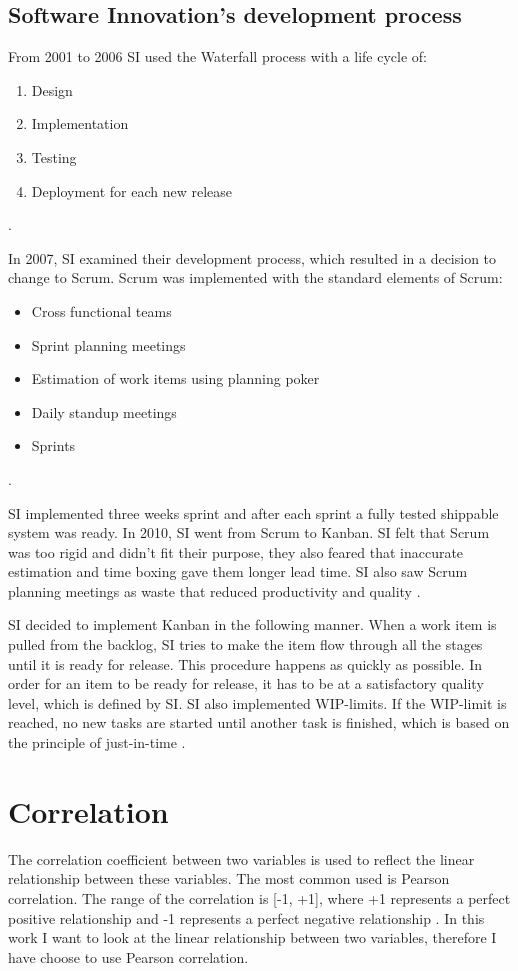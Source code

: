 \documentclass[UKenglish]{ifimaster}  %
\begin{document}
\subsection{Software Innovation's development process}
From 2001 to 2006 SI used the Waterfall process with a life cycle of:
\begin{enumerate}[noitemsep,topsep=0pt,parsep=0pt,partopsep=0pt]
\item Design
\item Implementation 
\item Testing
\item Deployment for each new release
\end{enumerate} 
\parencite{Dag}. 

In 2007, SI examined their development process, which resulted in a decision to change to Scrum. Scrum was implemented with the standard elements of Scrum:
\begin{itemize}[noitemsep,topsep=0pt,parsep=0pt,partopsep=0pt]
\item Cross functional teams
\item Sprint planning meetings 
\item Estimation of work items using planning poker
\item Daily standup meetings
\item Sprints
\end{itemize}
\parencite{Dag}. 

SI implemented three weeks sprint and after each sprint a fully tested shippable system was ready. In 2010, SI went from Scrum to Kanban. SI felt that Scrum was too rigid and didn't fit their purpose, they also feared that inaccurate estimation and time boxing gave them longer lead time. SI also saw Scrum planning meetings as waste that reduced productivity and quality \parencite{Dag}. 

SI decided to implement Kanban in the following manner. When a work item is pulled from the backlog, SI tries to make the item flow through all the stages until it is ready for release. This procedure happens as quickly as possible. In order for an item to be ready for release, it has to be at a satisfactory quality level, which is defined by SI. SI also implemented WIP-limits. If the WIP-limit is reached, no new tasks are started until another task is finished, which is based on the principle of just-in-time \parencite{Dag}.

\section{Correlation}
The correlation coefficient between two variables is used to reflect the linear relationship between these variables. The most common used is Pearson correlation.  The range of the correlation is [-1, +1], where +1 represents a perfect positive relationship and -1 represents a perfect negative relationship \parencite{6683402}. In this work I want to look at the linear relationship between two variables, therefore I have choose to use Pearson correlation.
\end{document}
